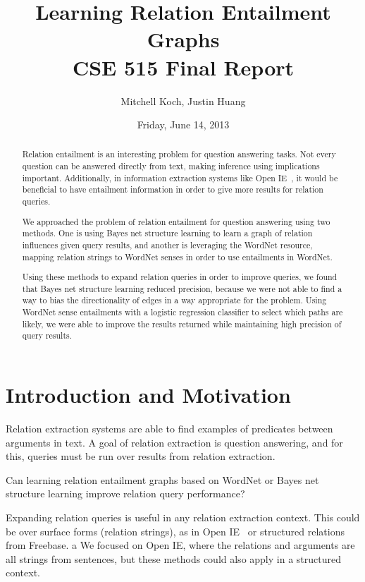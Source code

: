 \documentclass{article}
\author{Mitchell Koch, Justin Huang}
\title{Learning Relation Entailment Graphs\\CSE 515 Final Report}
\date{Friday, June 14, 2013}
\begin{document}
\maketitle

\begin{abstract}
Relation entailment is an interesting problem for question answering tasks. Not every question can be answered directly from text, making inference using implications important. Additionally, in information extraction systems like Open IE~\cite{Etzioni:2008:OIE:1409360.1409378}, it would be beneficial to have entailment information in order to give more results for relation queries.

We approached the problem of relation entailment for question answering using two methods. One is using Bayes net structure learning to learn a graph of relation influences given query results, and another is leveraging the WordNet resource, mapping relation strings to WordNet senses in order to use entailments in WordNet.

Using these methods to expand relation queries in order to improve queries, we found that Bayes net structure learning reduced precision, because we were not able to find a way to bias the directionality of edges in a way appropriate for the problem. Using WordNet sense entailments with a logistic regression classifier to select which paths are likely, we were able to improve the results returned while maintaining high precision of query results. %
\end{abstract}

\section{Introduction and Motivation}

Relation extraction systems are able to find examples of predicates between arguments in text. A goal of relation extraction is question answering, and for this, queries must be run over results from relation extraction. 

Can learning relation entailment graphs based on WordNet or Bayes net
structure learning improve relation query performance?

Expanding relation queries is useful in any relation extraction context. This could be over surface forms (relation strings), as in Open IE~\cite{Etzioni:2008:OIE:1409360.1409378} or structured relations from Freebase. a We focused on Open IE, where the relations and arguments are all strings from sentences, but these methods could also apply in a structured context.
\end{document}
